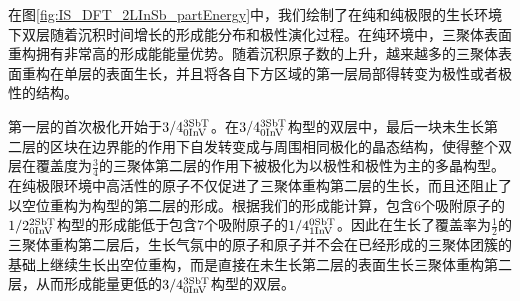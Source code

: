在图\ref{fig:IS_DFT_2LInSb_partEnergy}中，我们绘制了在纯和纯极限的生长环境下双层随着沉积时间增长的形成能分布和极性演化过程。在纯环境中，三聚体表面重构拥有非常高的形成能能量优势。随着沉积原子数的上升，越来越多的三聚体表面重构在单层的表面生长，并且将各自下方区域的第一层局部得转变为极性或者极性的结构。

第一层的首次极化开始于$\rm 3/4{}_{0InV}^{3SbT} \it$。在$\rm 3/4{}_{0InV}^{3SbT} \it$构型的双层中，最后一块未生长第二层的区块在边界能的作用下自发转变成与周围相同极化的晶态结构，使得整个双层在覆盖度为$\frac{3}{4}$的三聚体第二层的作用下被极化为以极性和极性为主的多晶构型。在纯极限环境中高活性的原子不仅促进了三聚体重构第二层的生长，而且还阻止了以空位重构为构型的第二层的形成。根据我们的形成能计算，包含6个吸附原子的$\rm 1/2{}_{0InV}^{2SbT} \it$构型的形成能低于包含7个吸附原子的$\rm 1/4{}_{1InV}^{0SbT} \it$。因此在生长了覆盖率为$\frac{1}{2}$的三聚体重构第二层后，生长气氛中的原子和原子并不会在已经形成的三聚体团簇的基础上继续生长出空位重构，而是直接在未生长第二层的表面生长三聚体重构第二层，从而形成能量更低的$\rm 3/4{}_{0InV}^{3SbT} \it$构型的双层。


